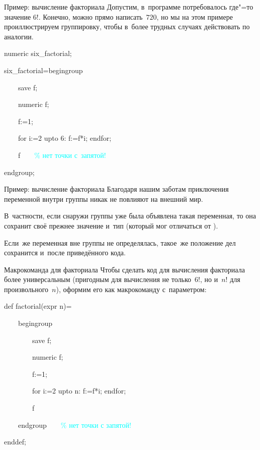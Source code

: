 \begin{frame}{Пример: вычисление факториала}
Допустим, в~программе потребовалось где"=то значение $6!$. Конечно, можно прямо
написать~$720$, но мы на этом примере проиллюстрируем группировку, чтобы
в~более трудных случаях действовать по аналогии.
\begin{programlisting}
numeric six\_factorial;\par
six\_factorial=begingroup\par
~~~~save f;\par
~~~~numeric f;\par
~~~~f:=1;\par
~~~~for i:=2 upto 6: f:=f*i; endfor;\par
~~~~\alert{f}~~~~\textcolor{cyan}{\% нет точки с~запятой!}\par
endgroup;
\end{programlisting}
\end{frame}

\begin{frame}{Пример: вычисление факториала}
Благодаря нашим заботам приключения переменной  внутри группы никак
не повлияют на внешний мир.

В~частности, если снаружи группы уже была объявлена такая переменная, то она
сохранит своё прежнее значение и~тип (который мог отличаться от
).

Если~же переменная  вне группы не определялась, такое~же положение
дел сохранится и~после приведённого кода.
\end{frame}

\begin{frame}{Макрокоманда для факториала}
Чтобы сделать код для вычисления факториала более универсальным (пригодным для
вычисления не только~$6!$, но и~$n!$ для произвольного~$n$), оформим его как
макрокоманду с~параметром:
\begin{programlisting}
def factorial(expr \alert{n})=\par
~~~~begingroup\par
~~~~~~~~save f;\par
~~~~~~~~numeric f;\par
~~~~~~~~f:=1;\par
~~~~~~~~for i:=2 upto \alert{n}: f:=f*i; endfor;\par
~~~~~~~~f\par
~~~~endgroup~~~~\textcolor{cyan}{\% нет точки с запятой!}\par
enddef;
\end{programlisting}
\end{frame}

